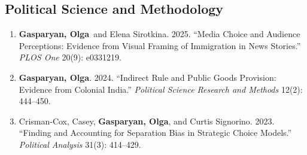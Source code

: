 \documentclass[10pt]{article}
\newcommand{\me}{\textbf{Gasparyan, Olga}}
\begin{document}
\subsection{Political Science and Methodology}
\begin{enumerate}
    \item \me\ and Elena Sirotkina. 2025. ``Media Choice and Audience Perceptions: Evidence from Visual Framing of Immigration in News Stories.'' \textit{PLOS One} 20(9): e0331219. 

    \item \me. 2024. ``Indirect Rule and Public Goods Provision: Evidence from Colonial India.'' \textit{Political Science Research and Methods} 12(2): 444--450.

    \item Crisman-Cox, Casey, \me, and Curtis Signorino. 2023. ``Finding and Accounting for Separation Bias in Strategic Choice Models.'' \textit{Political Analysis} 31(3): 414--429.
\end{enumerate}
\end{document}
